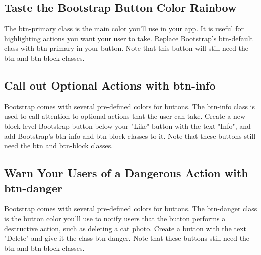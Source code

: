 \documentclass{article}%
\begin{document}
%
\subsection{Taste the Bootstrap Button Color Rainbow}%
\label{subsec:TastetheBootstrapButtonColorRainbow}%
The btn{-}primary class is the main color you'll use in your app. It is useful for highlighting actions you want your user to take.\newline%
Replace Bootstrap's btn{-}default class with btn{-}primary in your button.\newline%
Note that this button will still need the btn and btn{-}block classes.\newline%

%
\subsection{Call out Optional Actions with btn{-}info}%
\label{subsec:CalloutOptionalActionswithbtn{-}info}%
Bootstrap comes with several pre{-}defined colors for buttons. The btn{-}info class is used to call attention to optional actions that the user can take.\newline%
Create a new block{-}level Bootstrap button below your "Like" button with the text "Info", and add Bootstrap's btn{-}info and btn{-}block classes to it.\newline%
Note that these buttons still need the btn and btn{-}block classes.\newline%

%
\subsection{Warn Your Users of a Dangerous Action with btn{-}danger}%
\label{subsec:WarnYourUsersofaDangerousActionwithbtn{-}danger}%
Bootstrap comes with several pre{-}defined colors for buttons. The btn{-}danger class is the button color you'll use to notify users that the button performs a destructive action, such as deleting a cat photo.\newline%
Create a button with the text "Delete" and give it the class btn{-}danger.\newline%
Note that these buttons still need the btn and btn{-}block classes.\newline%

%
\end{document}
